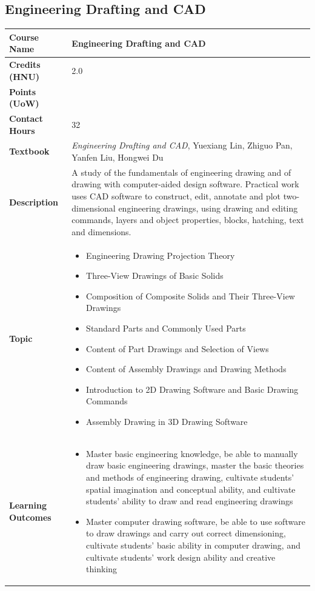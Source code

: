 \documentclass{article}
\begin{document}
\subsection{Engineering Drafting and CAD}
\renewcommand{\arraystretch}{1.5} %
\begin{longtable}{|p{3cm}|p{10cm}|}
\hline
\textbf{Course Name} & Engineering Drafting and CAD \\
\hline
\textbf{Credits (HNU)} & 2.0 \\
\hline
\textbf{Points (UoW)} & \\
\hline
\textbf{Contact Hours} & 32 \\
\hline
\textbf{Textbook} & \emph{Engineering Drafting and CAD}, Yuexiang Lin, Zhiguo Pan, Yanfen Liu, Hongwei Du \\
\hline
\textbf{Description} & A study of the fundamentals of engineering drawing and of drawing with computer-aided design software. Practical work uses CAD software to construct, edit, annotate and plot two-dimensional engineering drawings, using drawing and editing commands, layers and object properties, blocks, hatching, text and dimensions. \\
\hline
\textbf{Topic} & 
\begin{itemize}
    \item Engineering Drawing Projection Theory
    \item Three-View Drawings of Basic Solids
    \item Composition of Composite Solids and Their Three-View Drawings
    \item Standard Parts and Commonly Used Parts
    \item Content of Part Drawings and Selection of Views
    \item Content of Assembly Drawings and Drawing Methods
    \item Introduction to 2D Drawing Software and Basic Drawing Commands
    \item Assembly Drawing in 3D Drawing Software
\end{itemize}\\
\hline
\textbf{Learning Outcomes} & 
    \begin{itemize}
        \item Master basic engineering knowledge, be able to manually draw basic engineering drawings, master the basic theories and methods of engineering drawing, cultivate students' spatial imagination and conceptual ability, and cultivate students' ability to draw and read engineering drawings
        \item Master computer drawing software, be able to use software to draw drawings and carry out correct dimensioning, cultivate students' basic ability in computer drawing, and cultivate students' work design ability and creative thinking
    \end{itemize} \\
\hline
\end{longtable}
\end{document}
